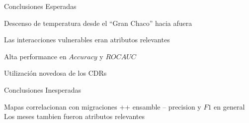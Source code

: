 \documentclass[xcolor=x11names]{beamer}
\begin{document}



\begin{frame}{Conclusiones Esperadas}

	Descenso de temperatura desde el ``Gran Chaco'' hacia afuera

	\medskip
	Las interacciones vulnerables eran atributos relevantes 

	\medskip
	Alta performance en $Accuracy$ y $ROC AUC$ 

	\medskip

	Utilizaci\'on novedosa de los CDRs 

\end{frame}


\begin{frame}{Conclusiones Inesperadas}

	Mapas correlacionan con migraciones 
	\medskip
	++ ensamble
	\medskip
	-- precision y $F1$ en general
	\medskip
	Los meses tambien fueron atributos relevantes


\end{frame}
\end{document}

